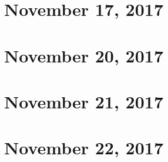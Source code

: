 \section{November 17, 2017}



\section{November 20, 2017}


\section{November 21, 2017}

\section{November 22, 2017}

